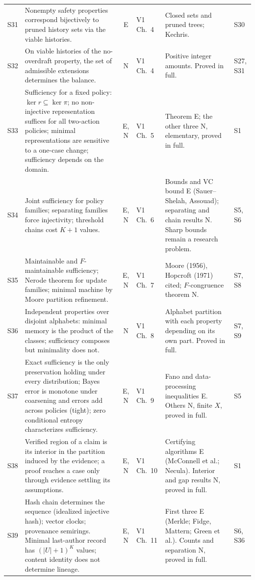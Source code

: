 \documentclass[10pt]{article}
\begin{document}
\begin{longtable}{@{}l p{} c l p{} p{}@{}}
S31 & Nonempty safety properties correspond bijectively to pruned history sets via the viable histories. & E & V1 Ch.~4 & Closed sets and pruned trees; Kechris. & S30\\[3pt]
S32 & On viable histories of the no-overdraft property, the set of admissible extensions determines the balance. & N & V1 Ch.~4 & Positive integer amounts. Proved in full. & S27, S31\\[3pt]
S33 & Sufficiency for a fixed policy: $\ker r\subseteq\ker\pi$; no non-injective representation suffices for all two-action policies; minimal representations are sensitive to a one-case change; sufficiency depends on the domain. & E, N & V1 Ch.~5 & Theorem E; the other three N, elementary, proved in full. & S1\\[3pt]
S34 & Joint sufficiency for policy families; separating families force injectivity; threshold chains cost $K+1$ values. & E, N & V1 Ch.~6 & Bounds and VC bound E (Sauer--Shelah, Assouad); separating and chain results N. Sharp bounds remain a research problem. & S5, S6\\[3pt]
S35 & Maintainable and $F$-maintainable sufficiency; Nerode theorem for update families; minimal machine by Moore partition refinement. & E, N & V1 Ch.~7 & Moore (1956), Hopcroft (1971) cited; $F$-congruence theorem N. & S7, S8\\[3pt]
S36 & Independent properties over disjoint alphabets: minimal memory is the product of the classes; sufficiency composes but minimality does not. & N & V1 Ch.~8 & Alphabet partition with each property depending on its own part. Proved in full. & S7, S9\\[3pt]
S37 & Exact sufficiency is the only preservation holding under every distribution; Bayes error is monotone under coarsening and errors add across policies (tight); zero conditional entropy characterizes sufficiency. & E, N & V1 Ch.~9 & Fano and data-processing inequalities E. Others N, finite $X$, proved in full. & S5\\[3pt]
S38 & Verified region of a claim is its interior in the partition induced by the evidence; a proof reaches a case only through evidence settling its assumptions. & E, N & V1 Ch.~10 & Certifying algorithms E (McConnell et al.; Necula). Interior and gap results N, proved in full. & S1\\[3pt]
S39 & Hash chain determines the sequence (idealized injective hash); vector clocks; provenance semirings. Minimal last-author record has $(|U|+1)^K$ values; content identity does not determine lineage. & E, N & V1 Ch.~11 & First three E (Merkle; Fidge, Mattern; Green et al.). Counts and separation N, proved in full. & S6, S36\\[3pt]

\end{longtable}
\end{document}
